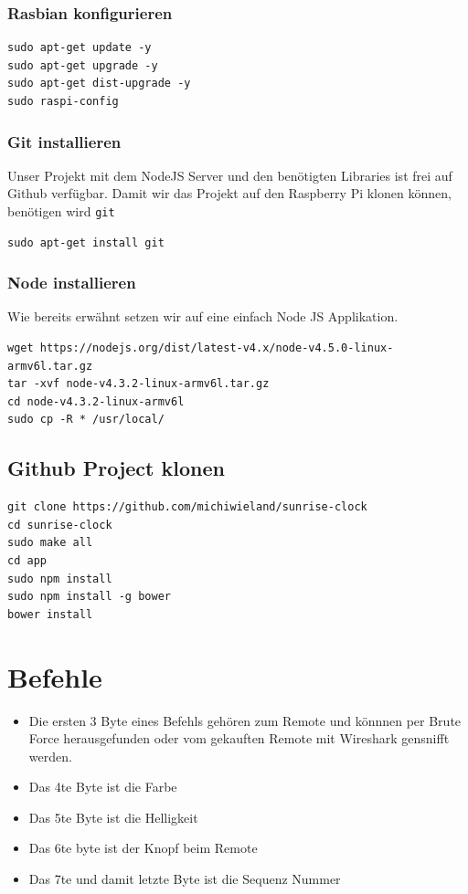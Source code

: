 \subsubsection{Rasbian konfigurieren}
\begin{lstlisting}
sudo apt-get update -y
sudo apt-get upgrade -y
sudo apt-get dist-upgrade -y
sudo raspi-config
\end{lstlisting}

\subsubsection{Git installieren}
Unser Projekt mit dem NodeJS Server und den benötigten Libraries ist frei auf Github verfügbar. Damit wir das Projekt auf den Raspberry Pi klonen können, benötigen wird \lstinline|git|
\begin{lstlisting}[caption=Git installieren]
sudo apt-get install git
\end{lstlisting}

\subsubsection{Node installieren}
Wie bereits erwähnt setzen wir auf eine einfach Node JS Applikation. 
\begin{lstlisting}[caption=Node installieren]
wget https://nodejs.org/dist/latest-v4.x/node-v4.5.0-linux-armv6l.tar.gz   
tar -xvf node-v4.3.2-linux-armv6l.tar.gz 
cd node-v4.3.2-linux-armv6l
sudo cp -R * /usr/local/
\end{lstlisting}

\subsection{Github Project klonen}
\begin{lstlisting}[caption=Github klonen]
git clone https://github.com/michiwieland/sunrise-clock
cd sunrise-clock
sudo make all
cd app
sudo npm install
sudo npm install -g bower
bower install
\end{lstlisting}

\section{Befehle}
\begin{itemize}
	\item Die ersten 3 Byte eines Befehls gehören zum Remote und könnnen per Brute Force herausgefunden oder vom gekauften Remote mit Wireshark gensnifft werden.
	\item Das 4te Byte ist die Farbe
	\item Das 5te Byte ist die Helligkeit
	\item Das 6te byte ist der Knopf beim Remote
	\item Das 7te und damit letzte Byte ist die Sequenz Nummer
\end{itemize}

